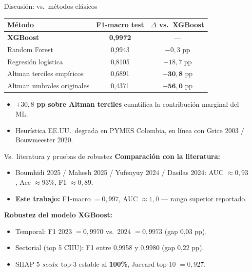\documentclass[10pt, aspectratio=169, xcolor=dvipsnames]{beamer}
\begin{document}
\begin{frame}{Discusi\'on: vs.\ m\'etodos cl\'asicos}
\centering
\small
\setlength{\tabcolsep}{6pt}
\renewcommand{\arraystretch}{1.1}
\begin{tabular}{@{}l c c@{}}
\toprule
\textbf{M\'etodo} & \textbf{F1-macro test} & \textbf{$\Delta$ vs.\ XGBoost} \\
\midrule
\textbf{XGBoost}                   & \textbf{0,9972} & --- \\
Random Forest                      & 0,9943 & $-0{,}3$ pp \\
Regresi\'on log\'istica            & 0,8105 & $-18{,}7$ pp \\
Altman terciles emp\'iricos        & 0,6891 & $\mathbf{-30{,}8}$ pp \\
Altman umbrales originales         & 0,4371 & $\mathbf{-56{,}0}$ pp \\
\bottomrule
\end{tabular}
\medskip
\begin{itemize}
  \item \textbf{$+30{,}8$ pp sobre Altman terciles} cuantifica la contribuci\'on marginal del ML.
  \item Heur\'istica EE.UU.\ degrada en PYMES Colombia, en l\'inea con Grice 2003 / Bouwmeester 2020.
\end{itemize}
\end{frame}

\begin{frame}{Vs.\ literatura y pruebas de robustez}
\textbf{Comparaci\'on con la literatura:}
\begin{itemize}
  \item Boumhidi 2025 / Mahesh 2025 / Yufenyuy 2024 / Dasilas 2024: AUC $\approx 0{,}93$, Acc $\approx 93\%$, F1 $\approx 0{,}89$.
  \item \textbf{Este trabajo:} F1-macro $= 0{,}997$, AUC $\approx 1{,}0$ --- rango superior reportado.
\end{itemize}
\textbf{Robustez del modelo XGBoost:}
\begin{itemize}
  \item Temporal: F1 2023 $= 0{,}9970$ vs.\ 2024 $= 0{,}9973$ (gap 0,03 pp).
  \item Sectorial (top 5 CIIU): F1 entre 0,9958 y 0,9980 (gap 0,22 pp).
  \item SHAP 5 \emph{seeds}: top-3 estable al \textbf{100\%}, Jaccard top-10 $= 0{,}927$.
\end{itemize}
\end{frame}
\end{document}
